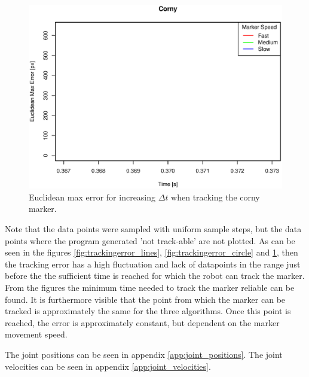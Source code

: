 \begin{figure}[H]
\centering
\includegraphics[width= \linewidth]{graphics/robotics/trackingerror_corny}
\caption{Euclidean max error for increasing $\Delta t$ when tracking the corny marker.}
\label{fig:trackingerror_corny}
\end{figure}

Note that the data points were sampled with uniform sample steps, but the data points where the program generated 'not track-able' are not plotted.
As can be seen in the figures \ref{fig:trackingerror_lines}, \ref{fig:trackingerror_circle} and \ref{fig:trackingerror_corny}, then the tracking error has a high fluctuation and lack of datapoints in the range just before the the sufficient time is reached for which the robot can track the marker.
From the figures the minimum time needed to track the marker reliable can be found.
It is furthermore visible that the point from which the marker can be tracked is approximately the same for the three algorithms.
Once this point is reached, the error is approximately constant, but dependent on the marker movement speed.


The joint positions can be seen in appendix \ref{app:joint_positions}.
The joint velocities can be seen in appendix \ref{app:joint_velocities}.